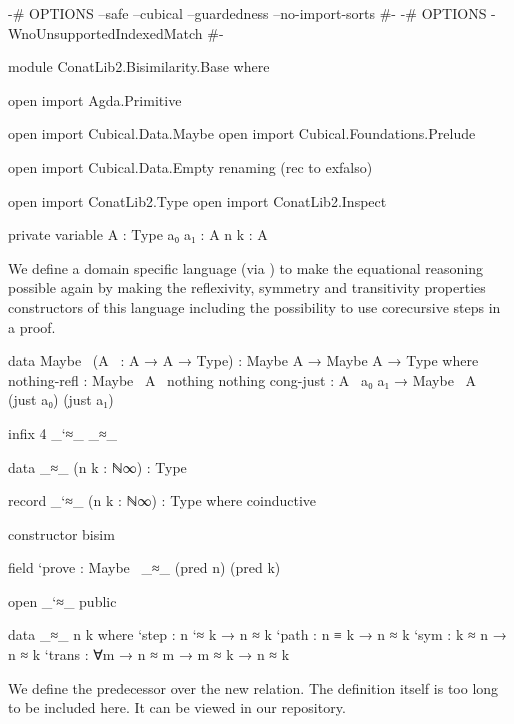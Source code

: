 \begin{code}[hide]
{-# OPTIONS --safe --cubical --guardedness --no-import-sorts #-}
{-# OPTIONS -WnoUnsupportedIndexedMatch #-}

module ConatLib2.Bisimilarity.Base where

open import Agda.Primitive

open import Cubical.Data.Maybe
open import Cubical.Foundations.Prelude

open import Cubical.Data.Empty
  renaming (rec to exfalso)

open import ConatLib2.Type
open import ConatLib2.Inspect

private variable
  A : Type
  a₀ a₁ : A
  n k : A
\end{code}

We define a domain specific language (via \cite{danielsson-beating}) to make
the equational reasoning possible again by making the reflexivity, symmetry and
transitivity properties constructors of this language including the possibility
to use corecursive steps in a proof.

\begin{code}
data Maybe~ (A~ : A → A → Type) :
  Maybe A → Maybe A → Type
  where
    nothing-refl : Maybe~ A~ nothing nothing
    cong-just : A~ a₀ a₁ → Maybe~ A~ (just a₀) (just a₁)
\end{code}
\begin{code}[hide]
infix 4 _`≈_ _≈_
\end{code}
\begin{code}
data _≈_ (n k : ℕ∞) : Type

record _`≈_ (n k : ℕ∞) : Type where
  coinductive
\end{code}
\begin{code}[hide]
  constructor bisim
\end{code}
\begin{code}
  field
    `prove : Maybe~ _≈_ (pred n) (pred k)
\end{code}
\begin{code}[hide]
open _`≈_ public
\end{code}
\begin{code}
data _≈_ n k where
  `step   : n `≈ k → n ≈ k
  `path   : n ≡ k → n ≈ k
  `sym    : k ≈ n → n ≈ k
  `trans  : ∀{m} → n ≈ m → m ≈ k → n ≈ k
\end{code}

We define the predecessor over the new  relation.
The definition itself is too long to be included here. It can be viewed
in our repository.


